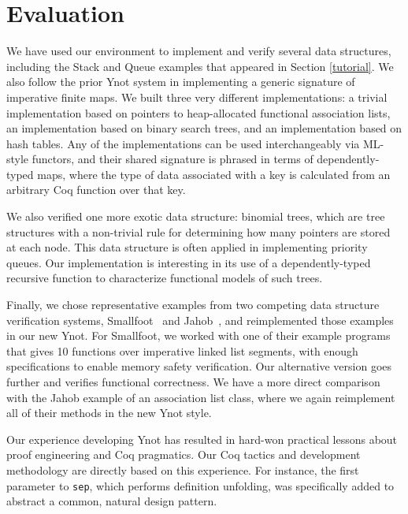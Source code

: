 \documentclass[preprint,nocopyrightspace]{sigplanconf}
\begin{document}

\section{Evaluation}

We have used our environment to implement and verify several data
structures, including the Stack and Queue examples that appeared in
Section \ref{tutorial}.  We also follow the prior Ynot system in
implementing a generic signature of imperative finite maps.  We built
three very different implementations: a trivial
implementation based on pointers to heap-allocated functional
association lists, an implementation based on binary search trees, and
an implementation based on hash tables.  Any of the implementations
can be used interchangeably via ML-style functors, and their shared
signature is phrased in terms of dependently-typed maps, where the
type of data associated with a key is calculated from an arbitrary
Coq function over that key.

We also verified one more exotic data structure: binomial trees, which
are tree structures with a non-trivial rule for determining how many
pointers are stored at each node.  This data structure is often
applied in implementing priority queues.  Our implementation is
interesting in its use of a dependently-typed recursive function to
characterize functional models of such trees.

Finally, we chose representative examples from two competing data
structure verification systems, Smallfoot~\cite{smallfoot} and
Jahob~\cite{jahob}, and reimplemented those examples in our new Ynot.
For Smallfoot, we worked with one of their example programs that gives
10 functions over imperative linked list segments, with enough
specifications to enable memory safety verification.  Our alternative
version goes further and verifies functional correctness.  We have a
more direct comparison with the Jahob example of an association list
class, where we again reimplement all of their methods in the new Ynot
style.

Our experience developing Ynot has resulted in hard-won practical
lessons about proof engineering and Coq pragmatics.  Our Coq tactics
and development methodology are directly based on this experience.
For instance, the first parameter to {\tt sep}, which performs
definition unfolding, was specifically added to abstract a common,
natural design pattern.
\end{document}
